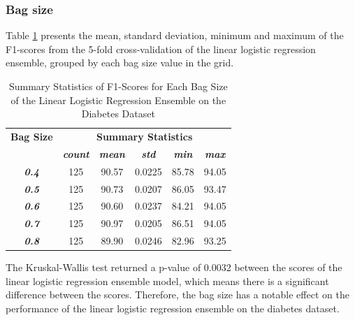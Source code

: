 \documentclass[10pt, conference]{IEEEtran}
\begin{document}
\subsubsection{Bag size}

Table \ref{table: D_bagsize_linear_performance_metrics} presents the mean, standard deviation, minimum and maximum of the
F1-scores from the 5-fold cross-validation of the linear logistic regression ensemble, grouped by each bag size
value in the grid.
\begin{table}[H]
    \caption{Summary Statistics of F1-Scores for Each Bag Size of the Linear Logistic Regression Ensemble on the Diabetes Dataset}
    \begin{center}
        \begin{tabular}{|c||c|c|c|c|c|}
            \hline
            \textbf{Bag Size}&\multicolumn{5}{|c|}{\textbf{Summary Statistics}} \\
            \cline{2-6}
                       &\textbf{\textit{count}} & \textbf{\textit{mean}} & \textbf{\textit{std}} & \textbf{\textit{min}} & \textbf{\textit{max}}\\
            \hline
            \textbf{\textit{0.4}} & 125 & 90.57 & 0.0225 & 85.78 & 94.05 \\
            \textbf{\textit{0.5}} & 125 & 90.73 & 0.0207 & 86.05 & 93.47 \\
            \textbf{\textit{0.6}} & 125 & 90.60 & 0.0237 & 84.21 & 94.05 \\
            \textbf{\textit{0.7}} & 125 & 90.97 & 0.0205 & 86.51 & 94.05 \\
            \textbf{\textit{0.8}} & 125 & 89.90 & 0.0246 & 82.96 & 93.25 \\
            \hline
        \end{tabular}
    \end{center}
    \label{table: D_bagsize_linear_performance_metrics}
\end{table}
The Kruskal-Wallis test returned a p-value of 0.0032 between the scores of the linear logistic regression ensemble model,
which means there is a significant difference between the scores. Therefore, the bag size has a notable effect on the
performance of the linear logistic regression ensemble on the diabetes dataset.
\end{document}
